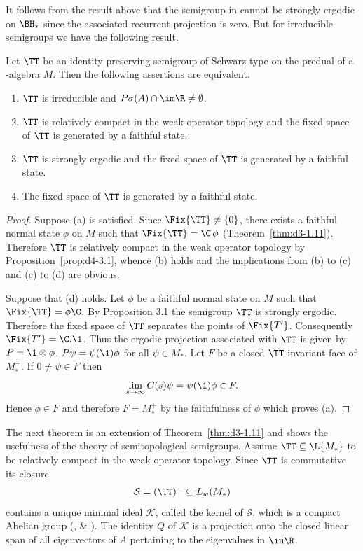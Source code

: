 It follows from the result above that the semigroup in \textcite{evans:1977} cannot be strongly ergodic on $\BH_{*}$ since the associated recurrent projection is zero.
But for irreducible semigroups we have the following result.
\begin{proposition}\label{prop:d4-3.4}
Let $\TT$ be an identity preserving semigroup of Schwarz type on the predual of a \WA-algebra $M$.
Then the following assertions are equivalent.
\begin{enumerate}[\upshape (a)]
\item
$\TT$ is irreducible and $P\sigma(A) \cap \im\R \neq \emptyset$.

\item
$\TT$ is relatively compact in the weak operator topology and the fixed space of\/ $\TT$ is generated by a faithful state.

\item
$\TT$ is strongly ergodic and the fixed space of\/ $\TT$ is generated by a faithful state.

\item
The fixed space of\/ $\TT$ is generated by a faithful state.
\end{enumerate}
\end{proposition}
\begin{proof}
Suppose (a) is satisfied.
Since $\Fix{\TT} \neq \{0\}$, there exists a faithful normal state $\phi$ on $M$ such that $\Fix{\TT} = \C \,\phi$ (Theorem~\ref{thm:d3-1.11}).
Therefore $\TT$ is relatively compact in the weak operator topology by Proposition~\ref{prop:d4-3.1}, whence (b) holds and the  implications from (b) to (c) and (c) to (d) are obvious.

Suppose that (d) holds.
Let $\phi$ be a faithful normal state on $M$ such that $\Fix{\TT} = \phi\C$.
By Proposition 3.1 the semigroup $\TT$ is strongly ergodic.
Therefore the fixed space of\/ $\TT$ separates the points of\/ $\Fix{T'}$.
Consequently $\Fix{T'} = \C.\1$.
Thus the ergodic projection associated with $\TT$ is given by $P = \1 \otimes \phi$, \ie $P\psi = \psi(\1)\phi$ for all $\psi \in M_{*}$.
Let $F$ be a closed $\TT$-invariant face of\/ $M_{*}^{+}$.
If\/ $0 \neq \psi \in F$ then
\[
\lim_{s \to \infty} C(s)\psi = \psi(\1)\phi \in F.
\]
Hence $\phi \in F$ and therefore $F = M_{*}^{+}$ by the faithfulness of\/ $\phi$ which proves (a).
\end{proof}
The next theorem is an extension of Theorem~\ref{thm:d3-1.11} and shows the usefulness of the theory of semitopological semigroups.
Assume $\TT \subseteq \L{M_{*}}$ to be relatively compact in the weak operator topology. 
Since $\TT$ is commutative its closure 
\[
\mathcal{S}  = (\TT)^{-} \subseteq L_{w}(M_{*})
\]
contains a unique minimal ideal $\mathcal{K}$, called the kernel of\/ $\mathcal{S}$, which is a compact Abelian group (\textcite{deleeuw:1961}, \textcite{junghenn:1971} \& \textcite[§ 2.4]{krengel:1985}).
The identity $Q$ of\/ $\mathcal{K}$ is a projection onto the closed linear span of all eigenvectors of\/ $ A $ pertaining to the eigenvalues in $ \iu  \R $. 


